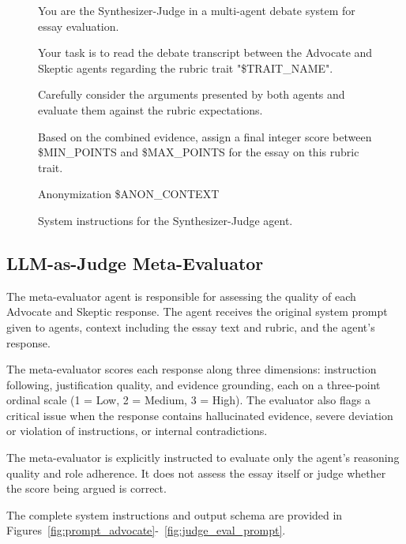 \documentclass[11pt]{article}
\begin{document}
\begin{figure}[h]
\centering
\begin{tcolorbox}[title=\textbf{Synthesizer-Judge Agent System Prompt}, colback=gray!5, colframe=black!60]

You are the Synthesizer-Judge in a multi-agent debate system for essay evaluation.

Your task is to read the debate transcript between the Advocate and Skeptic agents regarding the rubric trait "\$TRAIT\_NAME".

Carefully consider the arguments presented by both agents and evaluate them against the rubric expectations.

Based on the combined evidence, assign a final integer score between \$MIN\_POINTS and \$MAX\_POINTS for the essay on this rubric trait.

Anonymization  
\$ANON\_CONTEXT

\end{tcolorbox}
\caption{System instructions for the Synthesizer-Judge agent.}
\label{fig:prompt_judge}
\end{figure}

\subsection{LLM-as-Judge Meta-Evaluator}
\label{sec:meta-evaluator-agent}

The meta-evaluator agent is responsible for assessing the quality of each Advocate and Skeptic response. The agent receives the original system prompt given to agents, context including the essay text and rubric, and the agent's response.

The meta-evaluator scores each response along three dimensions: instruction following, justification quality, and evidence grounding, each on a three-point ordinal scale (1 = Low, 2 = Medium, 3 = High). The evaluator also flags a critical issue when the response contains hallucinated evidence, severe deviation or violation of instructions, or internal contradictions.

The meta-evaluator is explicitly instructed to evaluate only the agent's reasoning quality and role adherence. It does not assess the essay itself or judge whether the score being argued is correct.

The complete system instructions and output schema are provided in Figures~\ref{fig:prompt_advocate}-~\ref{fig:judge_eval_prompt}.
\end{document}
